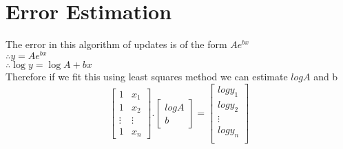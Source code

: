 \documentclass[11pt]{article}
\begin{document}
    \begin{center}
    \end{center}
    { \hspace*{\fill} \\}
    
    \hypertarget{error-estimation}{%
\section{Error Estimation}\label{error-estimation}}

The error in this algorithm of updates is of the form \(Ae^{bx}\)\\
\(\therefore y=Ae^{bx}\) \\\(\therefore \log{y}=\log{A}+bx\) \\Therefore if
we fit this using least squares method we can estimate \(log{A}\) and b
\begin{equation}
\begin{bmatrix}
    1       & x_{1}  \\
    1       & x_{2}  \\
    \vdots  & \vdots \\
    1       & x_{n} 
\end{bmatrix}
.
\begin{bmatrix}
    log{A}\\
    b
\end{bmatrix}
 =
\begin{bmatrix}
    log{y_{1}}\\
    log{y_{2}}\\
    \vdots    \\
    log{y_{n}}\\
\end{bmatrix} 
\end{equation}
\end{document}
